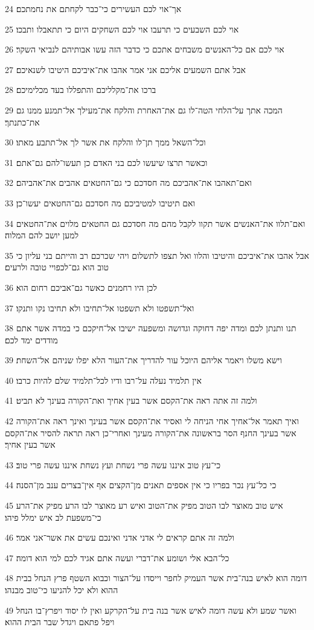 \par 24 אך־אוי לכם העשירים כי־כבר לקחתם את נחמתכם׃
\par 25 אוי לכם השבעים כי תרעבו אוי לכם השחקים היום כי תתאבלו ותבכו׃
\par 26 אוי לכם אם כל־האנשים משבחים אתכם כי כדבר הזה עשו אבותיהם לנביאי השקר׃
\par 27 אבל אתם השמעים אליכם אני אמר אהבו את־איביכם היטיבו לשנאיכם׃
\par 28 ברכו את־מקלליכם והתפללו בעד מכלימיכם׃
\par 29 המכה אתך על־הלחי הטה־לו גם את־האחרת והלקח את־מעילך אל־תמנע ממנו גם את־כתנתך׃
\par 30 וכל־השאל ממך תן־לו והלקח את אשר לך אל־תתבע מאתו׃
\par 31 וכאשר תרצו שיעשו לכם בני האדם כן תעשו־להם גם־אתם׃
\par 32 ואם־תאהבו את־אהביכם מה חסדכם כי גם־החטאים אהבים את־אהביהם׃
\par 33 ואם תיטיבו למטיביכם מה חסדכם גם־החטאים יעשו־כן׃
\par 34 ואם־תלוו את־האנשים אשר תקוו לקבל מהם מה חסדכם גם החטאים מלוים את־החטאים למען יושב להם המלוה׃
\par 35 אבל אהבו את־איביכם והיטיבו והלוו ואל תצפו לתשלום ויהי שכרכם רב והייתם בני עליון כי טוב הוא גם־לכפויי טובה ולרעים׃
\par 36 לכן היו רחמנים כאשר גם־אביכם רחום הוא׃
\par 37 ואל־תשפטו ולא תשפטו אל־תחיבו ולא תחיבו נקו ותנקו׃
\par 38 תנו ותנתן לכם ומדה יפה דחוקה וגדושה ומשפעה ישיבו אל־חיקכם כי במדה אשר אתם מודדים ימד לכם׃
\par 39 וישא משלו ויאמר אליהם היוכל עור להדריך את־העור הלא יפלו שניהם אל־השחת׃
\par 40 אין תלמיד נעלה על־רבו ודיו לכל־תלמיד שלם להיות כרבו׃
\par 41 ולמה זה אתה ראה את־הקסם אשר בעין אחיך ואת־הקורה בעינך לא תביט׃
\par 42 ואיך תאמר אל־אחיך אחי הניחה לי ואסיר את־הקסם אשר בעינך ואינך ראה את־הקורה אשר בעינך החנף הסר בראשונה את־הקורה מעינך ואחרי־כן ראה תראה להסיר את־הקסם אשר בעין אחיך׃
\par 43 כי־עץ טוב איננו עשה פרי נשחת ועץ נשחת איננו עשה פרי טוב׃
\par 44 כי כל־עץ נכר בפריו כי אין אספים תאנים מן־הקצים אף אין־בצרים ענב מן־הסנה׃
\par 45 איש טוב מאוצר לבו הטוב מפיק את־הטוב ואיש רע מאוצר לבו הרע מפיק את־הרע כי־משפעת לב איש ימלל פיהו׃
\par 46 ולמה זה אתם קראים לי אדני אדני ואינכם עשים את אשר־אני אמר׃
\par 47 כל־הבא אלי ושומע את־דברי ועשה אתם אגיד לכם למי הוא דומה׃
\par 48 דומה הוא לאיש בנה־בית אשר העמיק לחפר וייסדו על־הצור וכבוא השטף פרץ הנחל בבית ההוא ולא יכל להניעו כי־טוב מבנהו׃
\par 49 ואשר שמע ולא עשה דומה לאיש אשר בנה בית על־הקרקע ואין לו יסוד ויפרץ־בו הנחל ויפל פתאם ויגדל שבר הבית ההוא׃

